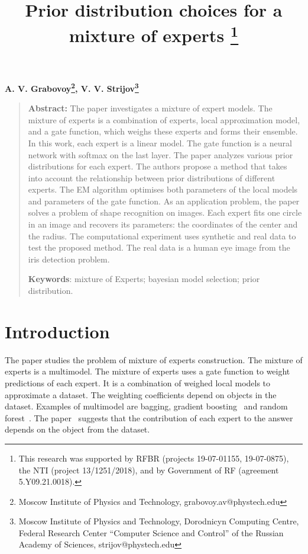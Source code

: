 \documentclass[12pt, twoside]{article}
\numberwithin{equation}{section}
\begin{document}
\title{\bf Prior distribution choices for a mixture of experts \thanks{This research was supported by RFBR (projects 19-07-01155, 19-07-0875),  the NTI (project 13/1251/2018), and by Government of RF (agreement 5.Y09.21.0018).}}
\date{}
\author{}
\maketitle

\begin{center}
\bf
A. V. Grabovoy\footnote{Moscow Institute of Physics and Technology, grabovoy.av@phystech.edu},
V. V. Strijov\footnote{Moscow Institute of Physics and Technology, Dorodnicyn Computing Centre, Federal Research Center “Computer Science and Control” of the Russian Academy of Sciences, strijov@phystech.edu}
\end{center}
{\centering\begin{quote}
\textbf{Abstract:} 
The paper investigates a mixture of expert models. 
The mixture of experts is a combination of experts, local approximation model, and a gate function, which weighs these experts and forms their ensemble. 
In this work, each expert is a linear model.
The gate function is a neural network with softmax on the last layer. 
The paper analyzes various prior distributions for each expert.
The authors propose a method that takes into account the relationship between prior distributions of different experts.
The EM algorithm optimises both parameters of the local models and parameters of the gate function.
As an application problem, the paper solves a problem of shape recognition on images.
Each expert fits one circle in an image and recovers its parameters: the coordinates of the center and the radius.
The computational experiment uses synthetic and real data to test the proposed method.
The real data is a human eye image from the iris detection problem.


\smallskip
\textbf{Keywords}: mixture of Experts; bayesian model selection; prior distribution.

\smallskip
\end{quote}
}

\section{Introduction}
The paper studies the problem of mixture of experts construction.
The mixture of experts is a multimodel. The mixture of experts uses a gate function to weight predictions of each expert.
It is a combination of weighed local models to approximate a dataset.
The weighting coefficients depend on objects in the dataset.
Examples of multimodel are bagging, gradient boosting~\cite{Tianqi2016} and random forest~\cite{Ishwaran2012}. 
The paper~\cite{Yuksel2012} suggests that the contribution of each expert to the answer depends on the object from the dataset.
\end{document}
